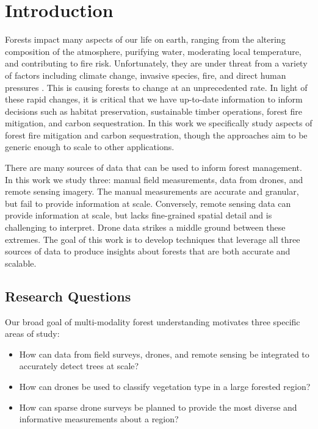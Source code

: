 
\chapter{Introduction} \label{chapIntroduction}
Forests impact many aspects of our life on earth, ranging from the altering composition of the atmosphere, purifying water, moderating local temperature, and contributing to fire risk. Unfortunately, they are under threat from a variety of factors including climate change, invasive species, fire, and direct human pressures \cite{IPCC2019ClimateReport}. This is causing forests to change at an unprecedented rate. In light of these rapid changes, it is critical that we have up-to-date information to inform decisions such as habitat preservation, sustainable timber operations, forest fire mitigation, and carbon sequestration. In this work we specifically study aspects of forest fire mitigation and carbon sequestration, though the approaches aim to be generic enough to scale to other applications. 

There are many sources of data that can be used to inform forest management. In this work we study three: manual field measurements, data from drones, and remote sensing imagery. The manual measurements are accurate and granular, but fail to provide information at scale. Conversely, remote sensing data can provide information at scale, but lacks fine-grained spatial detail and is challenging to interpret. Drone data strikes a middle ground between these extremes. The goal of this work is to develop techniques that leverage all three sources of data to produce insights about forests that are both accurate and scalable.
\section{Research Questions}
Our broad goal of multi-modality forest understanding motivates three specific areas of study:
\begin{itemize}
    \item How can data from field surveys, drones, and remote sensing be integrated to accurately detect trees at scale?
\end{itemize}
\begin{itemize}
    \item How can drones be used to classify vegetation type in a large forested region?
\end{itemize}
\begin{itemize}
    \item How can sparse drone surveys be planned to provide the most diverse and informative measurements about a region?
\end{itemize}

